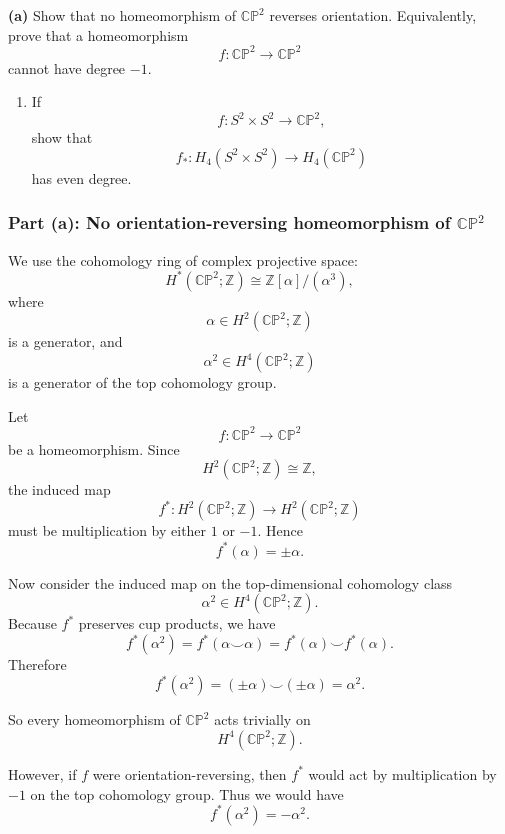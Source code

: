 \begin{problem}
\noindent\textbf{(a)} Show that no homeomorphism of \(\mathbb{CP}^{2}\) reverses
orientation. Equivalently, prove that a homeomorphism
\[
f:\mathbb{CP}^{2}\longrightarrow \mathbb{CP}^{2}
\]
cannot have degree \(-1\).

\begin{enumerate}
	\item[(b)] If
	\[
	f:S^{2}\times S^{2}\longrightarrow \mathbb{CP}^{2},
	\]
	show that
	\[
	f_{*}:H_{4}(S^{2}\times S^{2})\longrightarrow H_{4}(\mathbb{CP}^{2})
	\]
	has even degree.
\end{enumerate}
\end{problem}

\begin{solution}
\subsubsection*{Part (a): No orientation-reversing homeomorphism of \texorpdfstring{$\mathbb{CP}^{2}$}{CP2}}

We use the cohomology ring of complex projective space:
\[
H^{*}(\mathbb{CP}^{2};\mathbb{Z})
\cong
\mathbb{Z}[\alpha]/(\alpha^{3}),
\]
where
\[
\alpha\in H^{2}(\mathbb{CP}^{2};\mathbb{Z})
\]
is a generator, and
\[
\alpha^{2}\in H^{4}(\mathbb{CP}^{2};\mathbb{Z})
\]
is a generator of the top cohomology group.

Let
\[
f:\mathbb{CP}^{2}\longrightarrow \mathbb{CP}^{2}
\]
be a homeomorphism. Since
\[
H^{2}(\mathbb{CP}^{2};\mathbb{Z})\cong \mathbb{Z},
\]
the induced map
\[
f^{*}:H^{2}(\mathbb{CP}^{2};\mathbb{Z})
\longrightarrow
H^{2}(\mathbb{CP}^{2};\mathbb{Z})
\]
must be multiplication by either \(1\) or \(-1\). Hence
\[
f^{*}(\alpha)=\pm \alpha.
\]

Now consider the induced map on the top-dimensional cohomology class
\[
\alpha^{2}\in H^{4}(\mathbb{CP}^{2};\mathbb{Z}).
\]
Because \(f^{*}\) preserves cup products, we have
\[
f^{*}(\alpha^{2})
=
f^{*}(\alpha\smile \alpha)
=
f^{*}(\alpha)\smile f^{*}(\alpha).
\]
Therefore
\[
f^{*}(\alpha^{2})
=
(\pm \alpha)\smile(\pm \alpha)
=
\alpha^{2}.
\]

So every homeomorphism of \(\mathbb{CP}^{2}\) acts trivially on
\[
H^{4}(\mathbb{CP}^{2};\mathbb{Z}).
\]

However, if \(f\) were orientation-reversing, then \(f^{*}\) would act by multiplication by \(-1\) on the top cohomology group. Thus we would have
\[
f^{*}(\alpha^{2})=-\alpha^{2}.
\]


\end{solution}
